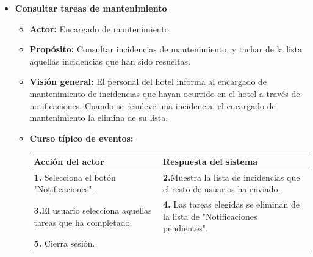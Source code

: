 \documentclass[spanish,a4paper,12pt]{report}		%
\begin{document}
\begin{itemize}
		\hspace{-1.5 true cm}
		\item \textbf{Consultar tareas de mantenimiento}
			\begin{itemize}
			\item \textbf{Actor: }Encargado de mantenimiento.
			\item \textbf{Propósito: }Consultar incidencias de mantenimiento, y tachar de la lista aquellas incidencias que han sido resueltas. 
			\item \textbf{Visión general: }El personal del hotel informa al encargado de mantenimiento de incidencias que hayan ocurrido en el hotel a través de notificaciones. Cuando se resuleve una incidencia, el encargado de mantenimiento la elimina de su lista. 
			\item \textbf{Curso típico de eventos:}\\ 	%
			\begin{tabular}{|p{6cm}||p{6cm}|}
				\hline
				\textbf{Acción del actor} & \textbf{Respuesta del sistema} \\ \hline \hline
				\textbf{1.} Selecciona el botón "Notificaciones". & \textbf{2.}Muestra la lista de incidencias que el resto de usuarios ha enviado.\\ \hline 
				\textbf{3.}El usuario selecciona aquellas tareas que ha completado. & \textbf{4.} Las tareas elegidas se eliminan de la lista de "Notificaciones pendientes".\\ \hline
				\textbf{5.} Cierra sesión. & \\ \hline
			\end{tabular}
		\end {itemize}
		

\end{itemize}
\end{document}
